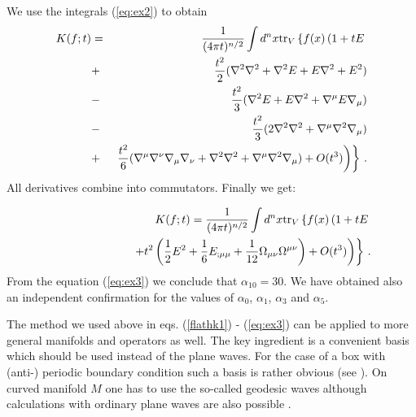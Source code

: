 We use the integrals (\ref{eq:ex2}) to obtain
\begin{eqnarray}
K(f;t)&=& \frac 1{(4\pi t )^{n/2}}   \int d^nx 
  {\rm tr}_V \left\{ f(x) \left( 1 + t E \right.\right.
\nonumber\\
&+&\frac {t^2}2 (\nabla^2 \nabla^2 +\nabla^2 E+E\nabla^2+E^2)
\nonumber \\
&-& \frac {t^2}3 (\nabla^2 E +E\nabla^2 +\nabla^\mu E\nabla_\mu )
\nonumber \\
&-& \frac {t^2}3 (2 \nabla^2 \nabla^2 +\nabla^\mu \nabla^2 \nabla_\mu )
\nonumber \\
&+& \left. \left.
\frac {t^2}6 (\nabla^\mu \nabla^\nu \nabla_\mu \nabla_\nu
+\nabla^2 \nabla^2+\nabla^\mu \nabla^2 \nabla_\mu )+O(t^3)
\right) \right\} \,.
\end{eqnarray}
All derivatives combine into commutators. Finally we get:

\begin{eqnarray}
&&K(f;t)=\frac 1{(4\pi t)^{n/2}} \int d^nx {\rm tr}_V \left\{ f(x)
\left( 1 +t E \right. \right. \nonumber \\
&&\qquad\qquad\qquad \left. \left. + t^2 \left(
\frac 12 E^2 +\frac 16 E_{;\mu\mu}+
\frac 1{12} \Omega_{\mu \nu}\Omega^{\mu \nu} \right) +O(t^3)\right)
\right\}\,.
\label{eq:ex3}
\end{eqnarray}
From the equation (\ref{eq:ex3}) we conclude that $\alpha_{10}=30$.
We have obtained also an independent confirmation for the values 
of $\alpha_0$, $\alpha_1$, $\alpha_3$ and $\alpha_5$.

The method we used above in eqs. (\ref{flathk1}) - (\ref{eq:ex3})
can be applied to more general manifolds and operators as well.
The key ingredient is a convenient basis which should be used
instead of the plane waves.  
For the case of a box with (anti-) periodic boundary condition
such a basis is rather obvious (see  
\cite{Andrianov:1984fg,Andrianov:1984qj}). On curved manifold
$M$ one has to use the so-called geodesic waves 
\cite{Fujikawa:1979ay,Fujikawa:1980eg,Yajima:1988pj,Yajima:1996jk,
Novozhilov:1991nm}
although calculations with ordinary plane 
waves are also possible \cite{Ceresole:1989hn}.

